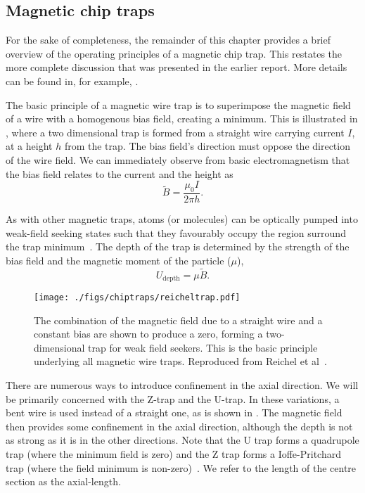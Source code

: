 \subsection*{Magnetic chip traps}

For the sake of completeness, the remainder of this chapter provides a brief
overview of the operating principles of a magnetic chip trap. This restates the
more complete discussion that was presented in the earlier report. More details
can be found in, for example, .

The basic principle of a magnetic wire trap is to superimpose the magnetic
field of a wire with a homogenous bias field, creating a minimum. This is
illustrated in , where a two dimensional
trap is formed from a straight wire carrying current $I$, at a height $h$ from
the trap. 
The bias field's direction must oppose the
direction of the wire field. We can immediately observe from basic
electromagnetism that the bias field relates to the current and the height
as~\cite{Reichel1999}
%
\begin{equation}
  \tilde{B} = \frac{\mu_0 I}{2\pi h}.
  \label{intro:eq:trapbias}
\end{equation}

As with other magnetic traps, atoms (or molecules) can be optically pumped into
weak-field seeking states such that they favourably occupy the region surround
the trap minimum~\cite{Metcalf1999}. The depth of the trap is determined by the
strength of the bias field and the magnetic moment of the particle ($\mu$),
%
\begin{equation}
  U_\text{depth} = \mu \tilde{B}. 
  \label{intro:eq:trapdepth}
\end{equation}

\begin{figure}
  \centering
  \texttt{[image: ./figs/chiptraps/reicheltrap.pdf]}
  \caption{The combination of the magnetic field due to a straight wire and a
  constant bias are shown to produce a zero, forming a two-dimensional trap for
  weak field seekers. This is the basic principle underlying all magnetic wire
  traps. Reproduced from Reichel et al~\cite{Reichel1999}.
  }
  \label{intro:fig:reicheltrap}
\end{figure}

There are numerous ways to introduce confinement in the axial direction. We
will be primarily concerned with the Z-trap and the U-trap. In these variations,
a bent wire is used instead of a straight one, as is shown in
. The magnetic field then provides some confinement in the
axial direction, although the depth is not as strong as it is in the other
directions. Note that the U trap forms a quadrupole trap (where the minimum
field is zero) and the Z trap forms a Ioffe-Pritchard trap (where the field
minimum is non-zero)~\cite{2011Ac}. We refer to the length of the centre section as
the axial-length.


